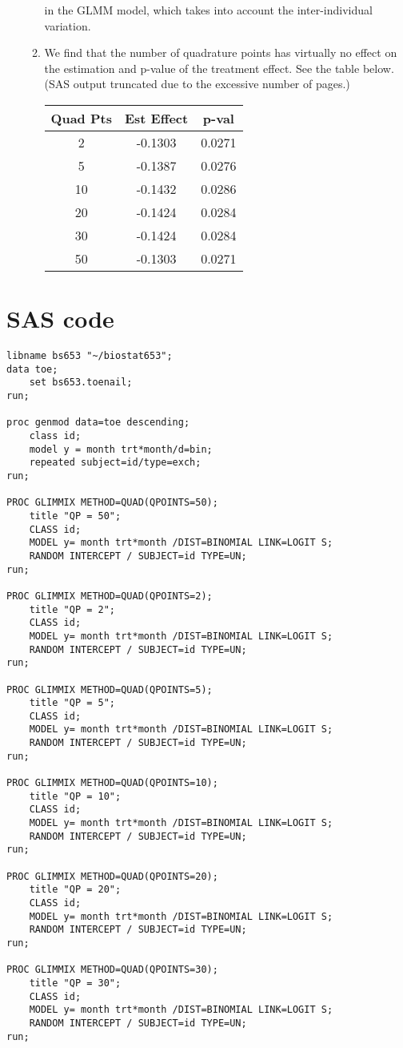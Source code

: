 \documentclass{article}
\begin{document}
\begin{enumerate}
\begin{enumerate}
    in the GLMM model, which takes into account the inter-individual
    variation.
  \item We find that the number of quadrature points has virtually no
    effect on the estimation and p-value of the treatment effect.  See
    the table below. (SAS output truncated due to the excessive number of pages.)
    \begin{center}
      \begin{tabular}{|c|c|c|}
        \hline
        Quad Pts & Est Effect & p-val \\
        \hline
        2 & -0.1303 & 0.0271 \\
        5 & -0.1387	& 0.0276 \\
        10 & -0.1432	& 0.0286 \\
        20 & -0.1424	& 0.0284 \\
        30 & -0.1424	& 0.0284 \\
        50 & -0.1303	& 0.0271 \\
        \hline
      \end{tabular}
    \end{center}
  \end{enumerate}
\end{enumerate}

\section{SAS code}


\begin{verbatim}
libname bs653 "~/biostat653";
data toe;
	set bs653.toenail;
run;

proc genmod data=toe descending;
	class id;
	model y = month trt*month/d=bin;
	repeated subject=id/type=exch;
run;

PROC GLIMMIX METHOD=QUAD(QPOINTS=50);
	title "QP = 50";
	CLASS id;
	MODEL y= month trt*month /DIST=BINOMIAL LINK=LOGIT S;
	RANDOM INTERCEPT / SUBJECT=id TYPE=UN;
run;

PROC GLIMMIX METHOD=QUAD(QPOINTS=2);
	title "QP = 2";
	CLASS id;
	MODEL y= month trt*month /DIST=BINOMIAL LINK=LOGIT S;
	RANDOM INTERCEPT / SUBJECT=id TYPE=UN;
run;

PROC GLIMMIX METHOD=QUAD(QPOINTS=5);
	title "QP = 5";
	CLASS id;
	MODEL y= month trt*month /DIST=BINOMIAL LINK=LOGIT S;
	RANDOM INTERCEPT / SUBJECT=id TYPE=UN;
run;

PROC GLIMMIX METHOD=QUAD(QPOINTS=10);
	title "QP = 10";
	CLASS id;
	MODEL y= month trt*month /DIST=BINOMIAL LINK=LOGIT S;
	RANDOM INTERCEPT / SUBJECT=id TYPE=UN;
run;

PROC GLIMMIX METHOD=QUAD(QPOINTS=20);
	title "QP = 20";
	CLASS id;
	MODEL y= month trt*month /DIST=BINOMIAL LINK=LOGIT S;
	RANDOM INTERCEPT / SUBJECT=id TYPE=UN;
run;

PROC GLIMMIX METHOD=QUAD(QPOINTS=30);
	title "QP = 30";
	CLASS id;
	MODEL y= month trt*month /DIST=BINOMIAL LINK=LOGIT S;
	RANDOM INTERCEPT / SUBJECT=id TYPE=UN;
run;
\end{verbatim}
\end{document}
